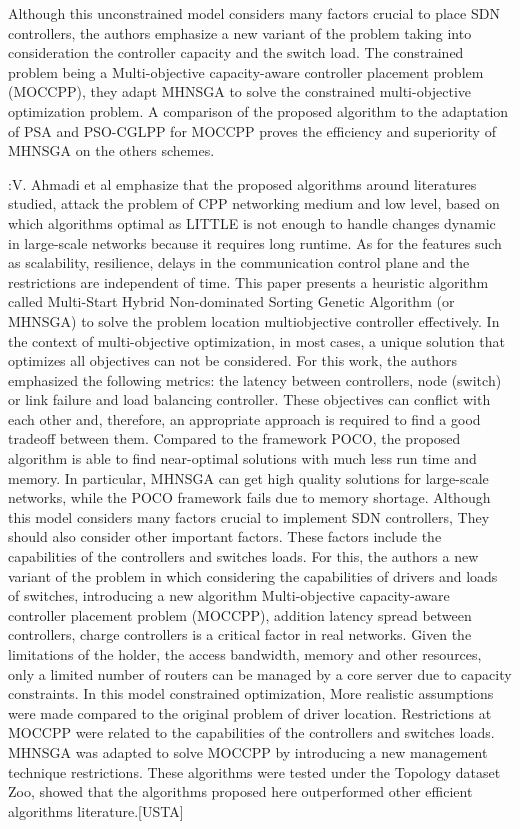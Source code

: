 \documentclass[a4paper,10pt]{article}
\begin{document}
Although this unconstrained model considers many factors crucial to place SDN controllers, the authors emphasize a new variant of the problem taking into consideration the controller capacity and the switch load. The constrained problem being a Multi-objective capacity-aware controller placement problem (MOCCPP), they adapt MHNSGA to solve the constrained multi-objective optimization problem. A comparison of the proposed algorithm to the adaptation of PSA and  PSO-CGLPP for MOCCPP proves the efficiency and superiority of MHNSGA on the others schemes.

\cite{VaMo18}:V. Ahmadi et al emphasize that the proposed algorithms around literatures studied, attack the problem of CPP networking medium and low level, based on which algorithms optimal as LITTLE is not enough to handle changes dynamic in large-scale networks because it requires long runtime. As for the features such as scalability, resilience, delays in the communication control plane and the restrictions are independent of time. This paper presents a heuristic algorithm called Multi-Start Hybrid Non-dominated Sorting Genetic Algorithm (or MHNSGA) to solve the problem location multiobjective controller effectively. In the context of multi-objective optimization, in most cases, a unique solution that optimizes all objectives can not be considered. For this work, the authors emphasized the following metrics: the latency between controllers, node (switch) or link failure and load balancing controller. These objectives can conflict with each other and, therefore, an appropriate approach is required to find a good tradeoff between them. Compared to the framework POCO, the proposed algorithm is able to find near-optimal solutions with much less run time and memory. In particular, MHNSGA can get high quality solutions for large-scale networks, while the POCO framework fails due to memory shortage. Although this model considers many factors crucial to implement SDN controllers, They should also consider other important factors. These factors include the capabilities of the controllers and switches loads. For this, the authors a new variant of the problem in which considering the capabilities of drivers and loads of switches, introducing a new algorithm Multi-objective capacity-aware controller placement problem (MOCCPP), addition latency spread between controllers, charge controllers is a critical factor in real networks. Given the limitations of the holder, the access bandwidth, memory and other resources, only a limited number of routers can be managed by a core server due to capacity constraints. In this model constrained optimization, More realistic assumptions were made compared to the original problem of driver location. Restrictions at MOCCPP were related to the capabilities of the controllers and switches loads. MHNSGA was adapted to solve MOCCPP by introducing a new management technique restrictions. These algorithms were tested under the Topology dataset Zoo, showed that the algorithms proposed here outperformed other efficient algorithms literature.[USTA]
\end{document}
